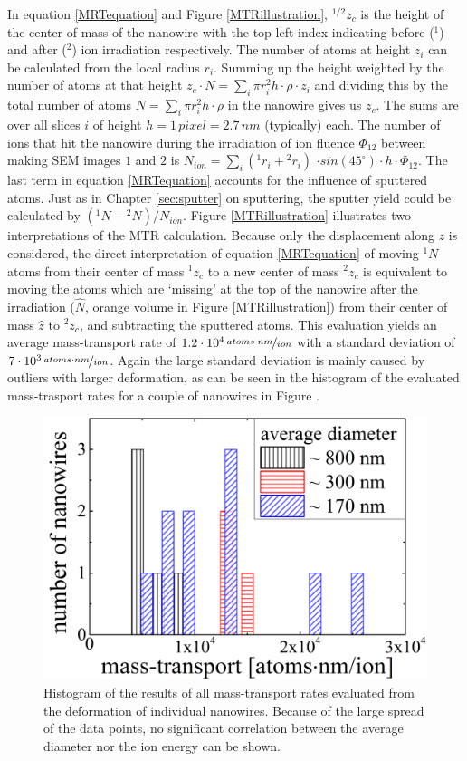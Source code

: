 In equation \ref{MRTequation} and Figure \ref{MTRillustration}, ${}^{1/2}z_{c}$ is the height of the center of mass of the nanowire with the top left index indicating before ($^1$) and after ($^2$) ion irradiation respectively. The number of atoms at height $z_i$ can be calculated from the local radius $r_i$. Summing up the height weighted by the number of atoms at that height $z_{c} \cdot N = \sum_i{\pi r_i^2 h \cdot \rho \cdot z_i}$ and dividing this by the total number of atoms $N = \sum_i{\pi r_i^2 h \cdot \rho}$ in the nanowire gives us $z_{c}$. The sums are over all slices $i$ of height $h = 1\,pixel = 2.7\,nm$ (typically) each. The number of ions that hit the nanowire during the irradiation of ion fluence $\Phi_{12}$ between making SEM images $1$ and $2$ is $N_{ion} = \sum_i{({}^{1}r_i+{}^{2}r_i)}$ $\cdot sin(45^\circ) \cdot h \cdot \Phi_{12}$. The last term in equation \ref{MRTequation} accounts for the influence of sputtered atoms. Just as in Chapter \ref{sec:sputter} on sputtering, the sputter yield could be calculated by $({}^{1}N - {}^{2}N)/N_{ion}$. Figure \ref{MTRillustration} illustrates two interpretations of the MTR calculation. Because only the displacement along $z$ is considered, the direct interpretation of equation \ref{MRTequation} of moving ${}^{1}N$ atoms from their center of mass ${}^{1}z_{c}$ to a new center of mass ${}^{2}z_{c}$ is equivalent to moving the atoms which are `missing' at the top of the nanowire after the irradiation ($\hat{N}$, orange volume in Figure \ref{MTRillustration}) from their center of mass $\hat{z}$ to ${}^{2}z_{c}$, and subtracting the sputtered atoms. This evaluation yields an average mass-transport rate of $1.2\cdot10^4 \,\nicefrac{atoms \cdot nm}{ion}$ with a standard deviation of $7\cdot 10^3\,\nicefrac{atoms \cdot nm}{ion}$. Again the large standard deviation is mainly caused by outliers with larger deformation, as can be seen in the histogram of the evaluated mass-trasport rates for a couple of nanowires in Figure \cite{MTReval}.

\begin{figure}
	\centering
		\includegraphics[width=.5\textwidth]{images/MTReval.png}
	\caption{Histogram of the results of all mass-transport rates evaluated from the deformation of individual nanowires. Because of the large spread of the data points, no significant correlation between the average diameter nor the ion energy can be shown.}
	\label{MTReval}
\end{figure}


